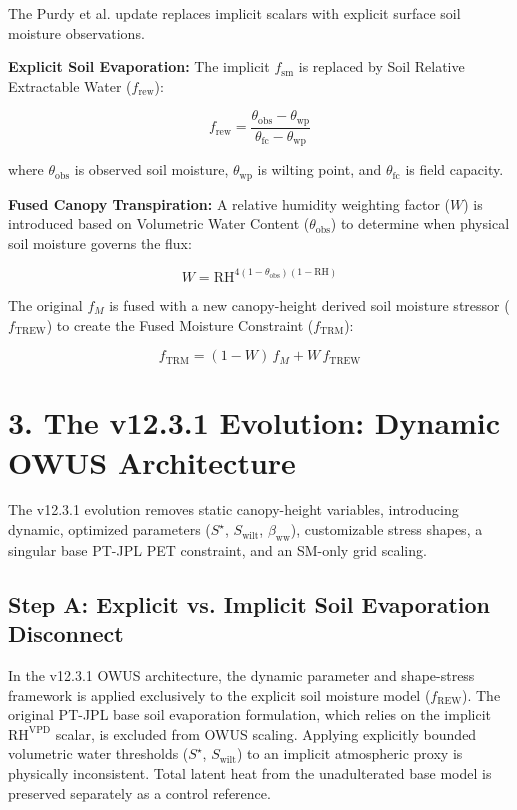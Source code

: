 \documentclass[11pt]{article}
\begin{document}
The Purdy et al. update replaces implicit scalars with explicit surface soil moisture observations.

\textbf{Explicit Soil Evaporation:} The implicit $f_{\mathrm{sm}}$ is replaced by Soil Relative Extractable Water ($f_{\mathrm{rew}}$):


$$f_{\mathrm{rew}} = \frac{\theta_{\mathrm{obs}} - \theta_{\mathrm{wp}}}{\theta_{\mathrm{fc}} - \theta_{\mathrm{wp}}}$$


where $\theta_{\mathrm{obs}}$ is observed soil moisture, $\theta_{\mathrm{wp}}$ is wilting point, and $\theta_{\mathrm{fc}}$ is field capacity.

\textbf{Fused Canopy Transpiration:} A relative humidity weighting factor ($W$) is introduced based on Volumetric Water Content ($\theta_{\mathrm{obs}}$) to determine when physical soil moisture governs the flux:


$$W = \mathrm{RH}^{4(1-\theta_{\mathrm{obs}})(1-\mathrm{RH})}$$

The original $f_{M}$ is fused with a new canopy-height derived soil moisture stressor ($f_{\mathrm{TREW}}$) to create the Fused Moisture Constraint ($f_{\mathrm{TRM}}$):


$$f_{\mathrm{TRM}} = (1-W)\,f_{M} + W\,f_{\mathrm{TREW}}$$

\section*{3. The v12.3.1 Evolution: Dynamic OWUS Architecture}

The v12.3.1 evolution removes static canopy-height variables, introducing dynamic, optimized parameters ($S^\star$, $S_{\mathrm{wilt}}$, $\beta_{\mathrm{ww}}$), customizable stress shapes, a singular base PT-JPL PET constraint, and an SM-only grid scaling.

\subsection*{Step A: Explicit vs. Implicit Soil Evaporation Disconnect}
In the v12.3.1 OWUS architecture, the dynamic parameter and shape-stress framework is applied exclusively to the explicit soil moisture model ($f_{\mathrm{REW}}$). The original PT-JPL base soil evaporation formulation, which relies on the implicit $\mathrm{RH}^{\mathrm{VPD}}$ scalar, is excluded from OWUS scaling. Applying explicitly bounded volumetric water thresholds ($S^\star$, $S_{\mathrm{wilt}}$) to an implicit atmospheric proxy is physically inconsistent. Total latent heat from the unadulterated base model is preserved separately as a control reference.
\end{document}

